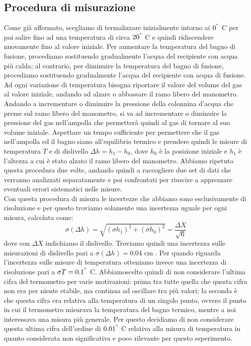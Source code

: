 \subsection{Procedura di misurazione}
Come già affermato, scegliamo di termalizzare inizialmente intorno ai $0^{\degree}$ C per poi salire fino ad una temperatura di circa $20^{\degree}$ C e quindi ridiscendere nuovamente fino al valore iniziale.
Per aumentare la temperatura del bagno di fusione, procediamo sostituendo gradualmente l'acqua del recipiente con acqua più calda; al contrario, per diminuire la temperatura del bagno di fusione, procediamo sostituendo gradualmente l'acqua del recipiente con acqua di fusione.
Ad ogni variazione di temperatura bisogna riportare il valore del volume del gas al valore iniziale, andando ad alzare o abbassare il ramo libero del manometro.
Andando a incrementare o diminuire la pressione della colonnina d'acqua che preme sul ramo libero del manometro, si va ad incrementare o diminuire la pressione del gas nell'ampolla che permetterà quindi al gas di tornare al suo volume iniziale.
Aspettare un tempo sufficiente per permettere che il gas nell'ampolla ed il bagno siano all'equilibrio termico e prendere quindi le misure di temperatura $T$ e di dislivello $\Delta h = h_1 - h_0$, dove $h_0$ è la posizione iniziale e $h_1$ è l'altezza a cui è stato alzato il ramo libero del manometro.
Abbiamo ripetuto questa procedura due volte, andando quindi a raccogliere due set di dati che verranno analizzati separatamente e poi confrontati per riuscire a apprezzare eventuali errori sistematici nelle misure.
\\
Con questa procedura di misura le incertezze che abbiamo sono esclusivamente di risoluzione e per questo troviamo solamente una incertezza uguale per ogni misura, calcolata come:
\begin{equation}
\sigma (\Delta h) = \sqrt{(\sigma h_1)^2 + (\sigma h_0)^2} = \frac{\Delta X}{\sqrt{6}}
\end{equation}
dove con $\Delta X$ indichiamo il dislivello.
Troviamo quindi una incertezza sulle misurazioni di dislivello pari a $\sigma (\Delta h) = 0.04$ cm .
Per quando riguarda l'incertezza sulle misure di temperatura otteniamo invece una incertezza di risoluzione pari a $\sigma T = 0.1^{\degree}$ C.
Abbiamoscelto quindi di non considerare l'ultima cifra del termometro per varie motivazioni: prima tra tutte quella che questa cifra non era per niente stabile, ma continua ad oscillare tra più valori; la seconda è che questa cifra era relativa alla temperatura di un singolo punto, ovvero il punto in cui il termometro misurava la temperatura del bagno termico, mentre a noi interessava una misura più generale.
Per questo decidiamo di non considerare questa ultima cifra dell'ordine di $0.01^{\degree}$ C relativa alla misura di temperatura in quanto considerata non significativa e poco rilevante per questo esperimento.

